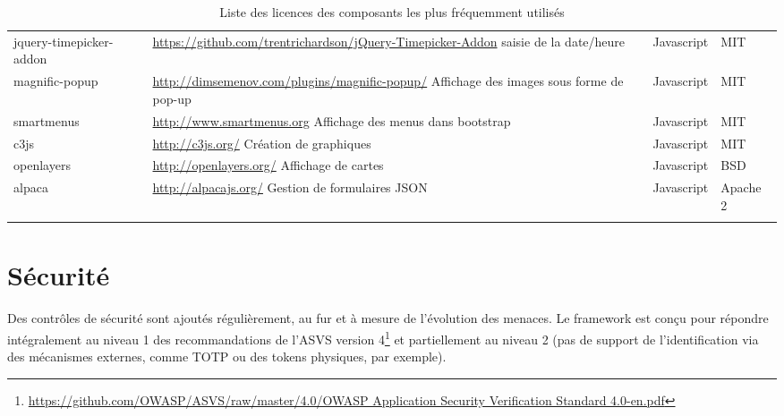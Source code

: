 \begin{longtable}{|>{\raggedright\arraybackslash}p{2cm}|>{\raggedright\arraybackslash}p{6cm}|>{\raggedright\arraybackslash}p{1.5cm}|>{\raggedright\arraybackslash}p{2cm}|}
jquery-timepicker-addon & \url{https://github.com/trentrichardson/jQuery-Timepicker-Addon} saisie de la date/heure & Javascript & MIT\\

magnific-popup & \url{http://dimsemenov.com/plugins/magnific-popup/} Affichage des images sous forme de pop-up & Javascript & MIT \\

smartmenus & \url{http://www.smartmenus.org} Affichage des menus dans bootstrap & Javascript & MIT\\

c3js & \url{http://c3js.org/} Création de graphiques & Javascript & MIT \\

openlayers & \url{http://openlayers.org/} Affichage de cartes & Javascript & BSD\\

alpaca & \url{http://alpacajs.org/} Gestion de formulaires JSON & Javascript & Apache 2\\

\hline

\caption{Liste des licences des composants les plus fréquemment utilisés}
\end{longtable} 


\section{Sécurité}
Des contrôles de sécurité sont ajoutés régulièrement, au fur et à mesure de l'évolution des menaces. Le framework est conçu pour répondre intégralement au niveau 1 des recommandations de l'ASVS version 4\footnote{\href{https://github.com/OWASP/ASVS/raw/master/4.0/OWASP Application Security Verification Standard 4.0-en.pdf}{https://github.com/OWASP/ASVS/raw/master/4.0/OWASP Application Security Verification Standard 4.0-en.pdf}} et partiellement au niveau 2 (pas de support de l'identification via des mécanismes externes, comme TOTP ou des tokens physiques, par exemple).